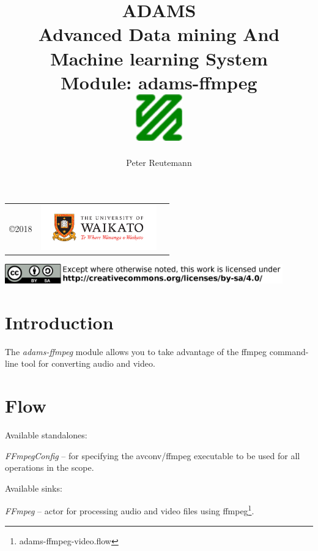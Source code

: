 \documentclass[a4paper]{book}
\title{
  \textbf{ADAMS} \\
  {\Large \textbf{A}dvanced \textbf{D}ata mining \textbf{A}nd \textbf{M}achine
  learning \textbf{S}ystem} \\
  {\Large Module: adams-ffmpeg} \\
  \vspace{1cm}
  \includegraphics[width=2cm]{images/ffmpeg-module.png} \\
}
\author{
  Peter Reutemann
}
\begin{document}
\begin{titlepage}
\maketitle

\thispagestyle{empty}
\center
\begin{table}[b]
	\begin{tabular}{c l l}
		\parbox[c][2cm]{2cm}{\copyright 2018} &
		\parbox[c][2cm]{5cm}{\includegraphics[width=5cm]{images/coat_of_arms.pdf}} \\
	\end{tabular}
	\includegraphics[width=12cm]{images/cc.png} \\
\end{table}

\end{titlepage}

\tableofcontents

\chapter{Introduction}
The \textit{adams-ffmpeg} module allows you to take advantage of the 
ffmpeg\cite{ffmpeg} command-line tool for converting audio and video.

\chapter{Flow}
\noindent Available standalones:
\begin{tight_itemize}
  \item \textit{FFmpegConfig} -- for specifying the avconv/ffmpeg executable
  to be used for all operations in the scope.
\end{tight_itemize}
\noindent Available sinks:
\begin{tight_itemize}
  \item \textit{FFmpeg} -- actor for processing audio and video files using
  ffmpeg\cite{ffmpeg}\footnote{adams-ffmpeg-video.flow}.
\end{tight_itemize}


\end{document}

